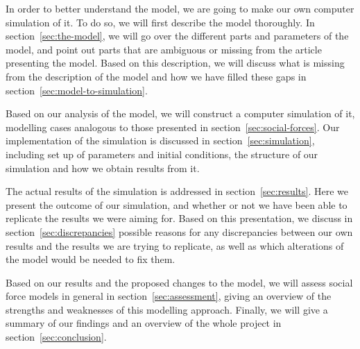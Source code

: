 In order to better understand the model, we are going to make our own computer
simulation of it. To do so, we will first describe the model thoroughly. In
section~\ref{sec:the-model}, we will go over the different parts and
parameters of the model, and point out parts that are ambiguous or missing
from the article presenting the model. Based on this description, we will
discuss what is missing from the description of the model and how we have
filled these gaps in section~\ref{sec:model-to-simulation}.

Based on our analysis of the model, we will construct a computer simulation of
it, modelling cases analogous to those presented in
section~\ref{sec:social-forces}. Our implementation of the simulation is discussed in section~\ref{sec:simulation}, including set up of
parameters and initial conditions, the structure of our simulation and how we
obtain results from it.

The actual results of the simulation is addressed in
section~\ref{sec:results}. Here we present the outcome of our simulation, and
whether or not we have been able to replicate the results we were aiming for.
Based on this presentation, we discuss in section~\ref{sec:discrepancies}
possible reasons for any discrepancies between our own results and the results
we are trying to replicate, as well as which alterations of the model would
be needed to fix them.

Based on our results and the proposed changes to the model, we will assess
social force models in general in section~\ref{sec:assessment}, giving an
overview of the strengths and weaknesses of this modelling approach. Finally,
we will give a summary of our findings and an overview of the whole project in
section~\ref{sec:conclusion}.
